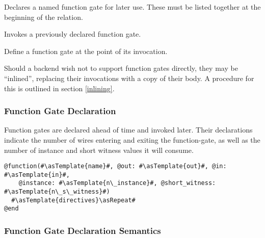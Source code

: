 \begin{description}[labelindent=0.375in]
    \item[Declaration] Declares a named function gate for later use.
      These must be listed together at the beginning of the relation.
    \item[Invocation] Invokes a previously declared function gate.
    \item[Anonymous Invocation] Define a function gate at the point of its invocation.
\end{description}

Should a backend wish not to support function gates directly, they may be ``inlined'', replacing their invocations with a copy of their body.
A procedure for this is outlined in section \ref{inlining}.\\

\subsubsection*{Function Gate Declaration}\label{function_declare_overview}
Function gates are declared ahead of time and invoked later.
Their declarations indicate the number of wires entering and exiting the function-gate, as well as the number of instance and short witness values it will consume.\\

\begin{lstlisting}
@function(#\asTemplate{name}#, @out: #\asTemplate{out}#, @in: #\asTemplate{in}#,
    @instance: #\asTemplate{n\_instance}#, @short_witness: #\asTemplate{n\_s\_witness}#)
  #\asTemplate{directives}\asRepeat#
@end
\end{lstlisting}

\subsubsection*{Function Gate Declaration Semantics}

